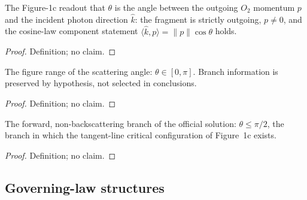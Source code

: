 \begin{definition}
\label{def:IPhO2026Problems_problem_IPhO_2026_1_C_1:IsScatteringAngle}
The Figure-1c readout that $\theta$ is the angle between the outgoing
$O_2$ momentum $p$ and the incident photon direction $\hat{k}$: the
fragment is strictly outgoing, $p \neq 0$, and the cosine-law component
statement $\langle \hat{k}, p \rangle = \|p\| \cos\theta$ holds.
\end{definition}
\begin{proof}
Definition; no claim.
\end{proof}

\begin{definition}
\label{def:IPhO2026Problems_problem_IPhO_2026_1_C_1:IsAngularRange}
The figure range of the scattering angle: $\theta \in [0, \pi]$.  Branch
information is preserved by hypothesis, not selected in conclusions.
\end{definition}
\begin{proof}
Definition; no claim.
\end{proof}

\begin{definition}
\label{def:IPhO2026Problems_problem_IPhO_2026_1_C_1:IsForwardBranch}
The forward, non-backscattering branch of the official solution:
$\theta \le \pi/2$, the branch in which the tangent-line critical
configuration of Figure~1c exists.
\end{definition}
\begin{proof}
Definition; no claim.
\end{proof}

\subsection*{Governing-law structures}

